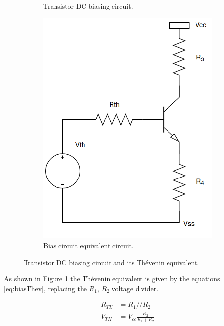 \begin{figure}[H]
\begin{subfigure}{0.4\textwidth}
        \caption{Transistor DC biasing circuit.}
    \end{subfigure}
    \hfill
    \begin{subfigure}{0.4\textwidth}
        \includegraphics*[scale = 0.3]{Images/VthBiasCircuit.png}
        \caption{Bias circuit equivalent circuit.}
        \label{fig:DCBiasTh}
    \end{subfigure}
    \caption{Transistor DC biasing circuit and its Thévenin equivalent.}
    \label{fig:DCBiasNPN}
\end{figure}

As shown in Figure \ref{fig:DCBiasTh} the Thévenin equivalent is given by the equations \ref{eq:biasThev}, replacing the $R_1$, $R_2$ voltage divider.

\begin{equation}
    \begin{split}
        R_{TH} &= R_1//R_2\\
        V_{TH} &= V_{cc}\frac{R_2}{R_1+R_2}
    \end{split}
    \label{eq:biasThev}
\end{equation}

